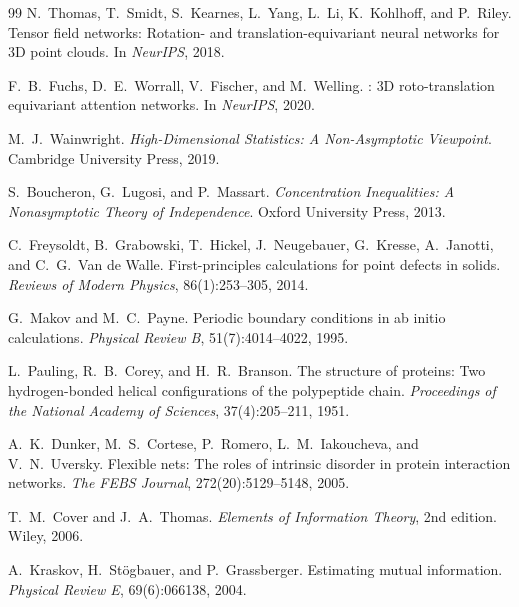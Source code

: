 \documentclass[11pt,a4paper]{article}
\theoremstyle{remark}
\begin{document}
\begin{thebibliography}{99}
N.~Thomas, T.~Smidt, S.~Kearnes, L.~Yang, L.~Li, K.~Kohlhoff, and P.~Riley.
\newblock Tensor field networks: Rotation- and translation-equivariant neural
  networks for {3D} point clouds.
\newblock In \emph{NeurIPS}, 2018.

F.~B.~Fuchs, D.~E.~Worrall, V.~Fischer, and M.~Welling.
: {3D} roto-translation equivariant attention
  networks.
\newblock In \emph{NeurIPS}, 2020.

M.~J.~Wainwright.
\newblock \emph{High-Dimensional Statistics: A Non-Asymptotic Viewpoint}.
\newblock Cambridge University Press, 2019.

S.~Boucheron, G.~Lugosi, and P.~Massart.
\newblock \emph{Concentration Inequalities: A Nonasymptotic Theory of
  Independence}.
\newblock Oxford University Press, 2013.

C.~Freysoldt, B.~Grabowski, T.~Hickel, J.~Neugebauer, G.~Kresse,
A.~Janotti, and C.~G.~Van de Walle.
\newblock First-principles calculations for point defects in solids.
\newblock \emph{Reviews of Modern Physics}, 86(1):253--305, 2014.

G.~Makov and M.~C.~Payne.
\newblock Periodic boundary conditions in ab initio calculations.
\newblock \emph{Physical Review B}, 51(7):4014--4022, 1995.

L.~Pauling, R.~B.~Corey, and H.~R.~Branson.
\newblock The structure of proteins: Two hydrogen-bonded helical configurations
  of the polypeptide chain.
\newblock \emph{Proceedings of the National Academy of Sciences},
  37(4):205--211, 1951.

A.~K.~Dunker, M.~S.~Cortese, P.~Romero, L.~M.~Iakoucheva, and V.~N.~Uversky.
\newblock Flexible nets: The roles of intrinsic disorder in protein interaction
  networks.
\newblock \emph{The FEBS Journal}, 272(20):5129--5148, 2005.

T.~M.~Cover and J.~A.~Thomas.
\newblock \emph{Elements of Information Theory}, 2nd edition.
\newblock Wiley, 2006.

A.~Kraskov, H.~St\"{o}gbauer, and P.~Grassberger.
\newblock Estimating mutual information.
\newblock \emph{Physical Review E}, 69(6):066138, 2004.

\end{thebibliography}

\end{document}
